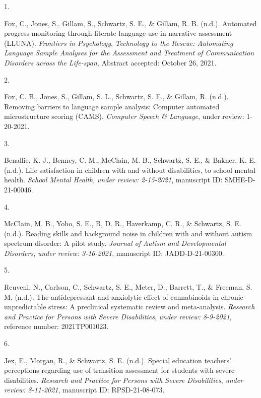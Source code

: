 \documentclass[11pt,a4paper,]{moderncv}
\newlength{\csllabelwidth}
\newcommand{\CSLLeftMargin}[1]{\parbox[t]{\csllabelwidth}{#1}}
\newcommand{\CSLRightInline}[1]{\parbox[t]{\linewidth - \csllabelwidth}{#1}}
\begin{document}
\hypertarget{refs_journalspress}{}
\leavevmode{}%
\CSLLeftMargin{1. }
\CSLRightInline{Fox, C., Jones, S., Gillam, S., Schwartz, S. E., \&
Gillam, R. B. (n.d.). Automated progress-monitoring through literate
language use in narrative assessment (LLUNA). \emph{Frontiers in
Psychology}, \emph{Technology to the Rescue: Automating Language Sample
Analyses for the Assessment and Treatment of Communication Disorders
across the Life-span}, Abstract accepted: October 26, 2021.}

\leavevmode{}%
\CSLLeftMargin{2. }
\CSLRightInline{Fox, C. B., Jones, S., Gillam, S. L., Schwartz, S. E.,
\& Gillam, R. (n.d.). Removing barriers to language sample analysis:
Computer automated microstructure scoring (CAMS). \emph{Computer Speech
\& Language}, under review: 1-20-2021.}

\leavevmode{}%
\CSLLeftMargin{3. }
\CSLRightInline{Benallie, K. J., Benney, C. M., McClain, M. B.,
Schwartz, S. E., \& Bakner, K. E. (n.d.). Life satisfaction in children
with and without disabilities, to school mental health. \emph{School
Mental Health}, \emph{under review: 2-15-2021}, manuscript ID:
SMHE-D-21-00046.}

\leavevmode{}%
\CSLLeftMargin{4. }
\CSLRightInline{McClain, M. B., Yoho, S. E., B, D. R., Haverkamp, C. R.,
\& Schwartz, S. E. (n.d.). Reading skills and background noise in
children with and without autism spectrum disorder: A pilot study.
\emph{Journal of Autism and Developmental Disorders}, \emph{under
review: 3-16-2021}, manuscript ID: JADD-D-21-00300.}

\leavevmode{}%
\CSLLeftMargin{5. }
\CSLRightInline{Reuveni, N., Carlson, C., Schwartz, S. E., Meter, D.,
Barrett, T., \& Freeman, S. M. (n.d.). The antidepressant and anxiolytic
effect of cannabinoids in chronic unpredictable stress: A preclinical
systematic review and meta-analysis. \emph{Research and Practice for
Persons with Severe Disabilities}, \emph{under review: 8-9-2021},
reference number: 2021TP001023.}

\leavevmode{}%
\CSLLeftMargin{6. }
\CSLRightInline{Jex, E., Morgan, R., \& Schwartz, S. E. (n.d.). Special
education teachers' perceptions regarding use of transition assessment
for students with severe disabilities. \emph{Research and Practice for
Persons with Severe Disabilities}, \emph{under review: 8-11-2021},
manuscript ID: RPSD-21-08-073.}
\end{document}
